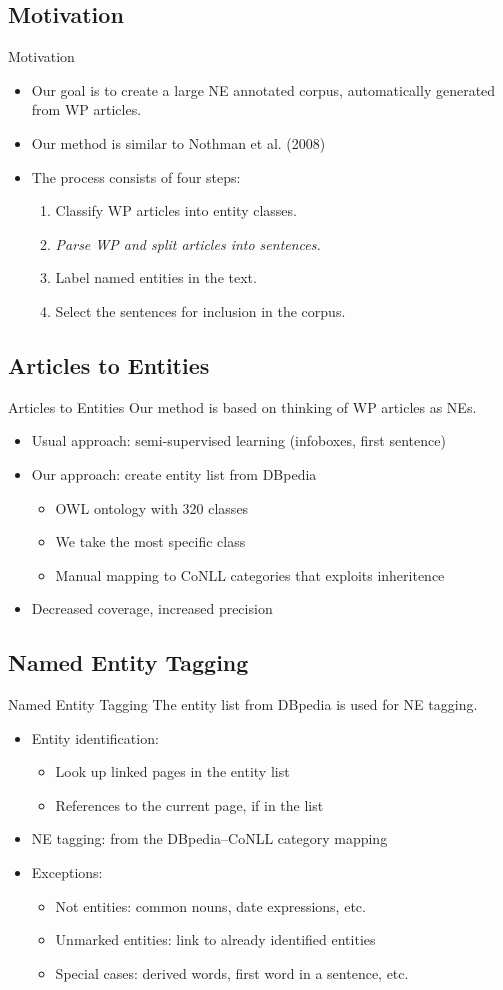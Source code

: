 \documentclass[utf8x,t]{beamer}
\newcommand{\vitem}{\item \vspace{4pt}}
\begin{document}
\subsection*{Motivation}
\begin{frame}{Motivation}
  \bigskip

  \begin{itemize}
  \item Our goal is to create a large NE annotated corpus, automatically
        generated from WP articles.
  \smallskip
  \vitem Our method is similar to Nothman et al. (2008)
  \vitem The process consists of four steps:
    \begin{enumerate}
    \vitem Classify WP articles into entity classes.
    \vitem \textit{Parse WP and split articles into sentences.}
    \vitem Label named entities in the text.
    \vitem Select the sentences for inclusion in the corpus.
    \end{enumerate}
  \end{itemize}
\end{frame}

\subsection{Articles to Entities}
\begin{frame}{Articles to Entities}
  \bigskip
  Our method is based on thinking of WP articles as NEs.
  \smallskip
  \begin{itemize}
  \vitem Usual approach: semi-supervised learning (infoboxes, first sentence)
  \vitem Our approach: create entity list from DBpedia
    \begin{itemize}
    \vitem OWL ontology with 320 classes
    \vitem We take the most specific class
    \vitem Manual mapping to CoNLL categories that exploits inheritence
    \end{itemize}
  \item Decreased coverage, increased precision
  \end{itemize}
\end{frame}

\subsection{Named Entity Tagging}
\begin{frame}{Named Entity Tagging}
  \bigskip
  The entity list from DBpedia is used for NE tagging.
  \smallskip
  \begin{itemize}
  \vitem Entity identification:
    \begin{itemize}
    \vitem Look up linked pages in the entity list
    \vitem References to the current page, if in the list
    \end{itemize}
  \vitem NE tagging: from the DBpedia--CoNLL category mapping
  \vitem Exceptions:
    \begin{itemize}
    \vitem Not entities: common nouns, date expressions, etc.
    \vitem Unmarked entities: link to already identified entities
    \vitem Special cases: derived words, first word in a sentence, etc.
    \end{itemize}
  \end{itemize}
\end{frame}
\end{document}
